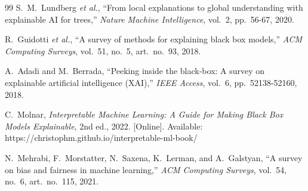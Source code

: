 \documentclass[conference]{IEEEtran}
\begin{document}
\begin{thebibliography}{99}
S.~M.~Lundberg \emph{et al.}, ``From local explanations to global
understanding with explainable AI for trees,'' \emph{Nature Machine
Intelligence}, vol.~2, pp.~56-67, 2020.

R.~Guidotti \emph{et al.}, ``A survey of methods for explaining black box
models,'' \emph{ACM Computing Surveys}, vol.~51, no.~5, art.~no.~93, 2018.

A.~Adadi and M.~Berrada, ``Peeking inside the black-box: A survey on
explainable artificial intelligence (XAI),'' \emph{IEEE Access}, vol.~6,
pp.~52138-52160, 2018.

C.~Molnar, \emph{Interpretable Machine Learning: A Guide for Making Black Box
Models Explainable}, 2nd ed., 2022. [Online]. Available:
https://christophm.github.io/interpretable-ml-book/

N.~Mehrabi, F.~Morstatter, N.~Saxena, K.~Lerman, and A.~Galstyan, ``A survey
on bias and fairness in machine learning,'' \emph{ACM Computing Surveys},
vol.~54, no.~6, art.~no.~115, 2021.

\end{thebibliography}
\end{document}
